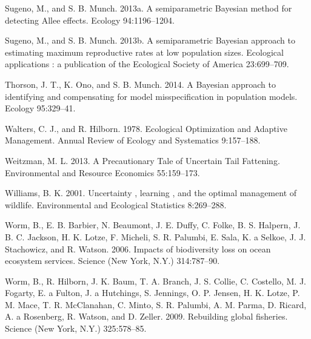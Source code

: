 \documentclass[author-year, 12pt,review]{components/elsarticle} %
\begin{document}
Sugeno, M., and S. B. Munch. 2013a. A semiparametric Bayesian method for
detecting Allee effects. Ecology 94:1196--1204.

Sugeno, M., and S. B. Munch. 2013b. A semiparametric Bayesian approach
to estimating maximum reproductive rates at low population sizes.
Ecological applications : a publication of the Ecological Society of
America 23:699--709.

Thorson, J. T., K. Ono, and S. B. Munch. 2014. A Bayesian approach to
identifying and compensating for model misspecification in population
models. Ecology 95:329--41.

Walters, C. J., and R. Hilborn. 1978. Ecological Optimization and
Adaptive Management. Annual Review of Ecology and Systematics
9:157--188.

Weitzman, M. L. 2013. A Precautionary Tale of Uncertain Tail Fattening.
Environmental and Resource Economics 55:159--173.

Williams, B. K. 2001. Uncertainty , learning , and the optimal
management of wildlife. Environmental and Ecological Statistics
8:269--288.

Worm, B., E. B. Barbier, N. Beaumont, J. E. Duffy, C. Folke, B. S.
Halpern, J. B. C. Jackson, H. K. Lotze, F. Micheli, S. R. Palumbi, E.
Sala, K. a Selkoe, J. J. Stachowicz, and R. Watson. 2006. Impacts of
biodiversity loss on ocean ecosystem services. Science (New York, N.Y.)
314:787--90.

Worm, B., R. Hilborn, J. K. Baum, T. A. Branch, J. S. Collie, C.
Costello, M. J. Fogarty, E. a Fulton, J. a Hutchings, S. Jennings, O. P.
Jensen, H. K. Lotze, P. M. Mace, T. R. McClanahan, C. Minto, S. R.
Palumbi, A. M. Parma, D. Ricard, A. a Rosenberg, R. Watson, and D.
Zeller. 2009. Rebuilding global fisheries. Science (New York, N.Y.)
325:578--85.
\end{document}
